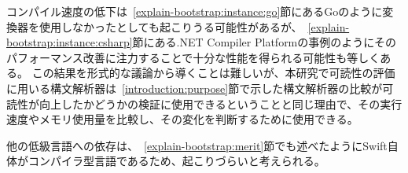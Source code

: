コンパイル速度の低下は~\ref{explain-bootstrap:instance:go}節にあるGoのように変換器を使用しなかったとしても起こりうる可能性があるが、~\ref{explain-bootstrap:instance:csharp}節にある.NET Compiler Platformの事例のようにそのパフォーマンス改善に注力することで十分な性能を得られる可能性も等しくある。
この結果を形式的な議論から導くことは難しいが、本研究で可読性の評価に用いる構文解析器は~\ref{introduction:purpose}節で示した構文解析器の比較が可読性が向上したかどうかの検証に使用できるということと同じ理由で、その実行速度やメモリ使用量を比較し、その変化を判断するために使用できる。

他の低級言語への依存は、~\ref{explain-bootstrap:merit}節でも述べたようにSwift自体がコンパイラ型言語であるため、起こりづらいと考えられる。

